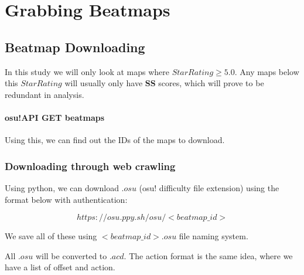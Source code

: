 

\section{Grabbing Beatmaps}

\subsection{Beatmap Downloading}

In this study we will only look at maps where $ Star Rating \geq 5.0 $. Any maps below this $Star Rating$ will usually only have \textbf{SS} scores, which will prove to be redundant in analysis.

\paragraph{osu!API GET beatmaps} Using this, we can find out the IDs of the maps to download.

\subsubsection{Downloading through web crawling}

Using python, we can download $.osu$ (osu! difficulty file extension) using the format below with authentication:

$$https://osu.ppy.sh/osu/<beatmap\_id>$$

We save all of these using $<beatmap\_id>.osu$ file naming system.

All $.osu$ will be converted to $.acd$. The action format is the same idea, where we have a list of offset and action.

